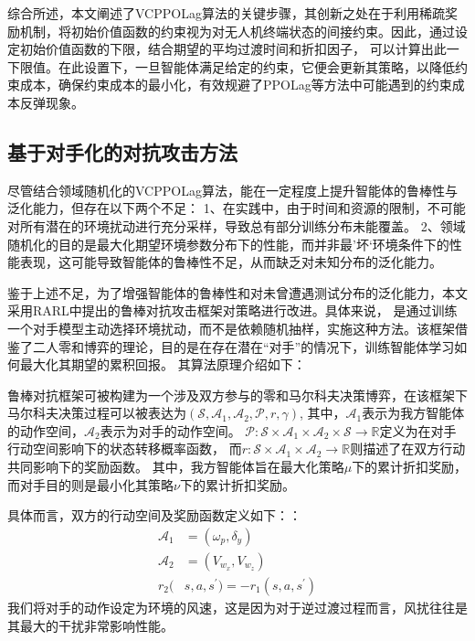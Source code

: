 综合所述，本文阐述了VCPPOLag算法的关键步骤，其创新之处在于利用稀疏奖励机制，将初始价值函数的约束视为对无人机终端状态的间接约束。因此，通过设定初始价值函数的下限，结合期望的平均过渡时间和折扣因子，
可以计算出此一下限值。在此设置下，一旦智能体满足给定的约束，它便会更新其策略，以降低约束成本，确保约束成本的最小化，有效规避了PPOLag等方法中可能遇到的约束成本反弹现象。

\subsection{基于对手化的对抗攻击方法}
尽管结合领域随机化的VCPPOLag算法，能在一定程度上提升智能体的鲁棒性与泛化能力，但存在以下两个不足：
1、在实践中，由于时间和资源的限制，不可能对所有潜在的环境扰动进行充分采样，导致总有部分训练分布未能覆盖。
2、领域随机化的目的是最大化期望环境参数分布下的性能，而并非最’坏‘环境条件下的性能表现，这可能导致智能体的鲁棒性不足，从而缺乏对未知分布的泛化能力。

鉴于上述不足，为了增强智能体的鲁棒性和对未曾遭遇测试分布的泛化能力，本文采用RARL\cite{pinto2017robust}中提出的鲁棒对抗攻击框架对策略进行改进。具体来说，
是通过训练一个对手模型主动选择环境扰动，而不是依赖随机抽样，实施这种方法。该框架借鉴了二人零和博弈的理论，目的是在存在潜在“对手”的情况下，训练智能体学习如何最大化其期望的累积回报。
其算法原理介绍如下：

鲁棒对抗框架可被构建为一个涉及双方参与的零和马尔科夫决策博弈，在该框架下马尔科夫决策过程可以被表达为$\left(\mathcal{S}, \mathcal{A}_{1}, \mathcal{A}_{2}, \mathcal{P}, r, \gamma\right)$,
其中，$\mathcal{A}_{1}$表示为我方智能体的动作空间，$\mathcal{A}_{2}$表示为对手的动作空间。
$\mathcal{P}: \mathcal{S} \times \mathcal{A}_{1} \times \mathcal{A}_{2} \times \mathcal{S} \rightarrow \mathbb{R}$定义为在对手行动空间影响下的状态转移概率函数，
而$r: \mathcal{S} \times \mathcal{A}_{1} \times \mathcal{A}_{2} \rightarrow \mathbb{R}$则描述了在双方行动共同影响下的奖励函数。
其中，我方智能体旨在最大化策略$\mu$下的累计折扣奖励，而对手目的则是最小化其策略$\nu$下的累计折扣奖励。

具体而言，双方的行动空间及奖励函数定义如下：：
\begin{align}
    \mathcal{A}_{1} & = \left ( \omega_{p},\delta_{y} \right ) \\
    \mathcal{A}_{2} & = \left (V_{w_{x}}, V_{w_{z}}\right )\\
    r_{2}(&s,a,s^{\prime})=-r_{1}(s,a,s^{\prime})
\end{align}
我们将对手的动作设定为环境的风速，这是因为对于逆过渡过程而言，风扰往往是其最大的干扰非常影响性能。

